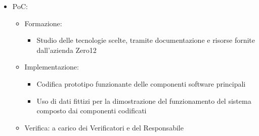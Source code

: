 {{\begin{itemize}
\begin{itemize}
                \item scelta delle tecnologie: rapido resoconto delle tecnologie testate con motivazione della scelta delle stesse, svolto dai Progettisti 
                \item progettazione PoC: descrizione generale del PoC, svolto dai progettisti
                \item verifica e approvazione: a carico dei Verificatori e del Responsabile
            \end{itemize}
        \item PoC: 
            \begin{itemize}
                \item Formazione: 
                    \begin{itemize}
                        \item Studio delle tecnologie scelte, tramite documentazione e risorse fornite dall’azienda Zero12
                    \end{itemize}
                \item Implementazione: 
                    \begin{itemize}
                        \item Codifica prototipo funzionante delle componenti software principali
                        \item Uso di dati fittizi per la dimostrazione del funzionamento del sistema composto dai componenti codificati
                    \end{itemize}
                \item Verifica: a carico dei Verificatori e del Responsabile
            \end{itemize}
    \end{itemize}
    
}}
